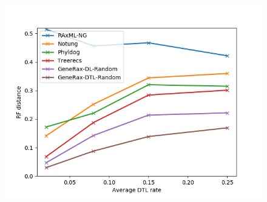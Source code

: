 \documentclass[12pt,a4paper]{article}
\begin{document}
\begin{figure}
\includegraphics[scale=0.5]{dtl_rates_multiplier_dtl.png}
\end{figure}
\end{document}
